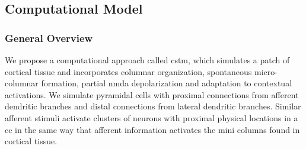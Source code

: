 \documentclass[10pt,letterpaper]{article}
\begin{document}







\subsection*{Computational Model}

\subsubsection*{General Overview}

We propose a computational approach called \gls{cstm}, which simulates a patch of cortical tissue and incorporates columnar organization, spontaneous micro-columnar formation, partial \gls{nmda} depolarization and adaptation to contextual activations. We simulate pyramidal cells with proximal connections from afferent dendritic branches and distal connections from lateral dendritic branches. Similar afferent stimuli activate clusters of neurons with proximal physical locations in a \gls{cc} in the same way that afferent information activates the mini columns found in cortical tissue.
\end{document}
